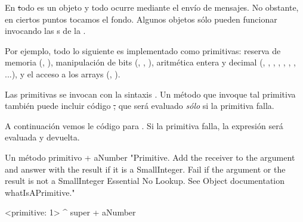 \documentclass[a4paper,10pt,twoside]{book}
\begin{document}
En \st todo es un objeto y todo ocurre mediante el envío de mensajes.
No obstante, en ciertos puntos tocamos el fondo.
Algunos objetos sólo pueden funcionar invocando las s de la .

Por ejemplo, todo lo siguiente es implementado como primitivas:
reserva de memoria (, ),
manipulación de bits (, , ),
aritmética entera y decimal (\ct{+}, \ct{-},  \ct{<},  \ct{>}, \ct{*}, \ct{/ }, \ct{=}, \ct{==}...),
y el acceso a los arrays (, ).

Las primitivas se invocan con la sintaxis .
Un método que invoque tal primitiva también puede incluir código \st, que será evaluado \emph{sólo} si la primitiva falla.

A continuación vemos le código para .
Si la primitiva falla, la expresión  será evaluada y devuelta.

\begin{method}[primitive]{Un método primitivo}
+ aNumber 
  "Primitive. Add the receiver to the argument and answer with the result
  if it is a SmallInteger. Fail if the argument or the result is not a
  SmallInteger  Essential  No Lookup. See Object documentation whatIsAPrimitive."

  <primitive: 1>
  ^ super + aNumber
\end{method}



\end{document}
